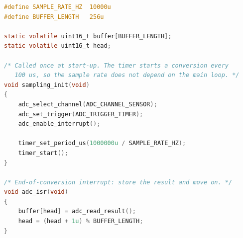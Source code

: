 
\begin{lstlisting}[caption={Timer-triggered sampling into a ring buffer.}, label={lst:adcSampling}, language=C]
#define SAMPLE_RATE_HZ  10000u
#define BUFFER_LENGTH   256u

static volatile uint16_t buffer[BUFFER_LENGTH];
static volatile uint16_t head;

/* Called once at start-up. The timer starts a conversion every
   100 us, so the sample rate does not depend on the main loop. */
void sampling_init(void)
{
    adc_select_channel(ADC_CHANNEL_SENSOR);
    adc_set_trigger(ADC_TRIGGER_TIMER);
    adc_enable_interrupt();

    timer_set_period_us(1000000u / SAMPLE_RATE_HZ);
    timer_start();
}

/* End-of-conversion interrupt: store the result and move on. */
void adc_isr(void)
{
    buffer[head] = adc_read_result();
    head = (head + 1u) % BUFFER_LENGTH;
}
\end{lstlisting}

